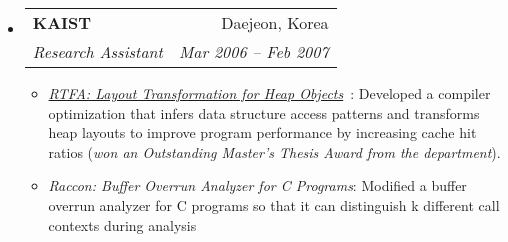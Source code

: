 \documentclass[letterpaper,11pt]{article}
\makeatletter
\newcommand{\ressubheading}[4]{
\begin{tabular*}{6.5in}{l@{\extracolsep{\fill}}r}
    \textbf{#1} & #2 \\
    \textit{#3} & \textit{#4} \\
\end{tabular*}\vspace{-6pt}}
\makeatother
\begin{document}
\begin{itemize}
    \item
      \ressubheading{{KAIST}}{Daejeon, Korea}{Research Assistant}{Mar 2006 -- Feb 2007}
        {
\small
        \begin{itemize}
\item\emph{\href{https://github.com/jsjeon/rtfa}{RTFA: Layout Transformation for Heap Objects}}~\cite{TACO09, cc07}:
Developed a compiler optimization that infers data structure access patterns
and transforms heap layouts to improve program performance
by increasing cache hit ratios
(\emph{won an Outstanding Master's Thesis Award from the department}).
\item\emph{Raccon: Buffer Overrun Analyzer for C Programs}:%
Modified a buffer overrun analyzer for C programs so that
it can distinguish k different call contexts during analysis
        \end{itemize}
        }
\end{itemize}  %
\end{document}
